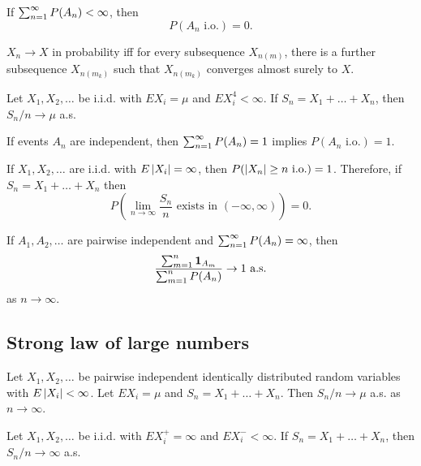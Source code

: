 \documentclass[a4paper]{article}
\begin{document}
\begin{thm}
  If $\sum_{n=1}^\infty P(A_n) < \infty$, then 
  \[
  P(A_n \text{ i.o.}) = 0.
  \]
\end{thm}

\begin{thm}
  $X_n \to X$ in probability iff for every subsequence $X_{n(m)}$, there 
  is a further subsequence $X_{n(m_k)}$ such that $X_{n(m_k)}$ converges 
  almost surely to $X$.
\end{thm}

\begin{thm}
  Let $X_1, X_2, \dots$ be i.i.d. with $E X_i = \mu$ and $E X_i^4 < \infty$.
  If $S_n = X_1 + \dots + X_n$, then $S_n / n \to \mu$ a.s.
\end{thm}

\begin{thm}
  If events $A_n$ are independent, then $\sum_{n=1}^\infty P(A_n) = 1$ implies $
  P(A_n \text{ i.o.}) = 1$.
\end{thm}

\begin{thm}
  If $X_1, X_2, \dots$ are i.i.d. with $E \left\lvert X_i\right\rvert = \infty$, then 
  $P(\left\lvert X_n\right\rvert \geq n \text{ i.o.}) = 1$. Therefore, if $S_n = X_1
  + \dots + X_n$ then 
  \[
  P \left( \lim_{n \to \infty} \frac{S_n}{n} \text{ exists in $(-\infty, 
  \infty)$} \right) = 0.
  \]
\end{thm}

\begin{thm}
  If $A_1, A_2, \dots$ are pairwise independent and $\sum_{n=1}^\infty P(A_n)
  = \infty$, then 
  \[
  \frac{\sum_{m=1}^n \operatorname{\mathbf{1}}_{A_m}}{\sum_{m=1}^n P(A_n)} \to 1 \text{ a.s.}
  \]
  as $n \to \infty$.
\end{thm}

\subsection{Strong law of large numbers}

\begin{thm}
  Let $X_1, X_2, \dots$ be pairwise independent identically distributed
  random variables with $E \left\lvert X_i\right\rvert < \infty$. Let $E X_i = \mu$ and 
  $S_n = X_1 + \dots + X_n$. Then $S_n / n \to \mu$ a.s. 
  as $n \to \infty$.
\end{thm}

\begin{thm}
  Let $X_1, X_2, \dots$ be i.i.d. with $E X_i^+ = \infty$ and 
  $E X_i^- < \infty$. If $S_n = X_1 + \dots + X_n$,
  then $S_n / n \to \infty$ a.s.
\end{thm}
\end{document}
